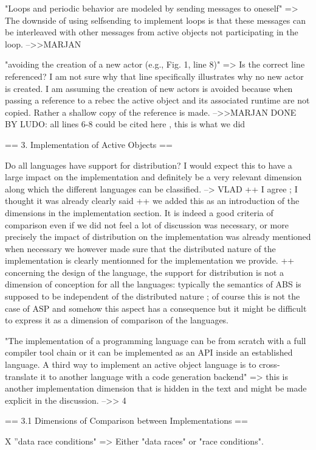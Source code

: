 \documentclass{article}
\begin{document}
"Loops and periodic behavior are modeled by sending messages to oneself" => The downside 
of using selfsending to implement loops is that these messages can be interleaved with 
other messages from active objects not participating in the loop.
-->>MARJAN

"avoiding the creation of a new actor (e.g., Fig. 1, line 8)" => Is the correct line 
referenced? I am not sure why that line specifically illustrates why no new actor is 
created. I am assuming the creation of new actors is avoided because when passing a 
reference to a rebec the active object and its associated runtime are not copied. Rather 
a shallow copy of the reference is made.
-->>MARJAN
DONE BY LUDO: all lines 6-8 could be cited here , this is what we did

== 3. Implementation of Active Objects ==

Do all languages have support for distribution? I would expect this to have a large 
impact on the implementation and definitely be a very relevant dimension along which the 
different languages can be classified.
--> VLAD
++ I agree ; I thought it was already clearly said
++ we added this as an introduction of the dimensions in the implementation section. It 
is indeed a good criteria of comparison even if we did not feel a lot of discussion was 
necessary, or more precisely the impact of distribution on the implementation was already 
mentioned when necessary we however made sure that the distributed nature of the 
implementation is clearly mentionned for the implementation we provide.
++ concerning the design of the language, the support for distribution is not a dimension 
of conception for all the languages: typically the semantics of ABS is supposed to be 
independent of the distributed nature ; of course this is not the case of ASP and somehow 
this aspect has a consequence but it might be difficult to express it as a dimension of 
comparison of the languages.

"The implementation of a programming language can be from scratch with a full compiler 
tool chain or it can be implemented as an API inside an established language. A third way 
to implement an active object language is to cross-translate it to another language with 
a code generation backend" => this is another implementation dimension that is hidden in 
the text and might be made explicit in the discussion.
-->> {4}

== 3.1 Dimensions of Comparison between Implementations ==

X ”data race conditions" => Either "data races" or "race conditions".
\end{document}
